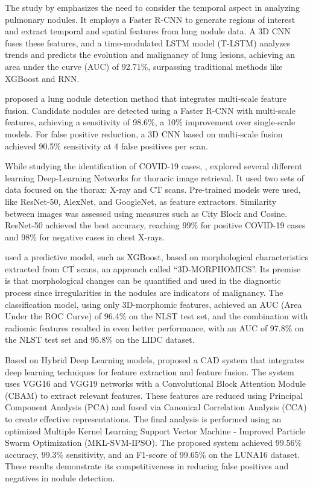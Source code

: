 The study by \citet{Liu2022} emphasizes the need to consider the temporal aspect in analyzing pulmonary nodules. It employs a Faster R-CNN to generate regions of interest and extract temporal and spatial features from lung nodule data. A 3D CNN fuses these features, and a time-modulated LSTM model (T-LSTM) analyzes trends and predicts the evolution and malignancy of lung lesions, achieving an area under the curve (AUC) of 92.71\%, surpassing traditional methods like XGBoost and RNN.

\citet{Zhao2022} proposed a lung nodule detection method that integrates multi-scale feature fusion. Candidate nodules are detected using a Faster R-CNN with multi-scale features, achieving a sensitivity of 98.6\%, a 10\% improvement over single-scale models. For false positive reduction, a 3D CNN based on multi-scale fusion achieved 90.5\% sensitivity at 4 false positives per scan.

While studying the identification of COVID-19 cases, \citet{Mahmoud2022}, explored several different learning Deep-Learning Networks for thoracic image retrieval. It used two sets of data focused on the thorax: X-ray and  CT scans. Pre-trained models were used, like ResNet-50, AlexNet, and GoogleNet, as feature extractors. Similarity between images was assessed using measures such as City Block and Cosine. ResNet-50 achieved the best accuracy, reaching 99\% for positive COVID-19 cases and 98\% for negative cases in chest X-rays. 

\citet{Munoz2022} used a predictive model, such as XGBoost, based on morphological characteristics extracted from CT scans, an approach called “3D-MORPHOMICS”. Its premise is that morphological changes can be quantified and used in the diagnostic process since irregularities in the nodules are indicators of malignancy. The classification model, using only 3D-morphomic features, achieved an AUC (Area Under the ROC Curve) of 96.4\% on the NLST test set, and the combination with radiomic features resulted in even better performance, with an AUC of 97.8\% on the NLST test set and 95.8\% on the LIDC dataset.

Based on Hybrid Deep Learning models, \citet{Li2022} proposed a CAD system that integrates deep learning techniques for feature extraction and feature fusion. The system uses VGG16 and VGG19 networks with a Convolutional Block Attention Module (CBAM) to extract relevant features. These features are reduced using Principal Component Analysis (PCA) and fused via Canonical Correlation Analysis (CCA) to create effective representations. The final analysis is performed using an optimized Multiple Kernel Learning Support Vector Machine - Improved Particle Swarm Optimization (MKL-SVM-IPSO). The proposed system achieved 99.56\% accuracy, 99.3\% sensitivity, and an F1-score of 99.65\% on the LUNA16 dataset. These results demonstrate its competitiveness in reducing false positives and negatives in nodule detection.

